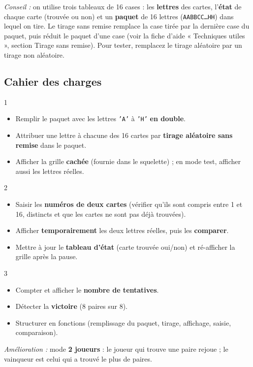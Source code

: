 \textit{Conseil :} on utilise trois tableaux de 16 cases : les \textbf{lettres} des cartes, l'\textbf{état} de chaque carte (trouvée ou non) et un \textbf{paquet} de 16 lettres (\texttt{AABBCC\dots HH}) dans lequel on tire. Le tirage sans remise remplace la case tirée par la dernière case du paquet, puis réduit le paquet d'une case (voir la fiche d'aide « Techniques utiles », section Tirage sans remise). Pour tester, remplacez le tirage aléatoire par un tirage non aléatoire.

\subsection*{Cahier des charges}
\begin{UPSTICahierDesCharges}{1}
\begin{itemize}
  \item Remplir le paquet avec les lettres \texttt{'A'} à \texttt{'H'} \textbf{en double}.
  \item Attribuer une lettre à chacune des 16 cartes par \textbf{tirage aléatoire sans remise} dans le paquet.
  \item Afficher la grille \textbf{cachée} (fournie dans le squelette) ; en mode test, afficher aussi les lettres réelles.
\end{itemize}
\end{UPSTICahierDesCharges}

\begin{UPSTICahierDesCharges}{2}
\begin{itemize}
  \item Saisir les \textbf{numéros de deux cartes} (vérifier qu'ils sont compris entre 1 et 16, distincts et que les cartes ne sont pas déjà trouvées).
  \item Afficher \textbf{temporairement} les deux lettres réelles, puis les \textbf{comparer}.
  \item Mettre à jour le \textbf{tableau d'état} (carte trouvée oui/non) et ré-afficher la grille après la pause.
\end{itemize}
\end{UPSTICahierDesCharges}

\begin{UPSTICahierDesCharges}{3}
\begin{itemize}
  \item Compter et afficher le \textbf{nombre de tentatives}.
  \item Détecter la \textbf{victoire} (8 paires sur 8).
  \item Structurer en fonctions (remplissage du paquet, tirage, affichage, saisie, comparaison).
\end{itemize}
\end{UPSTICahierDesCharges}

\textit{Amélioration :} mode \textbf{2 joueurs} : le joueur qui trouve une paire rejoue ; le vainqueur est celui qui a trouvé le plus de paires.


